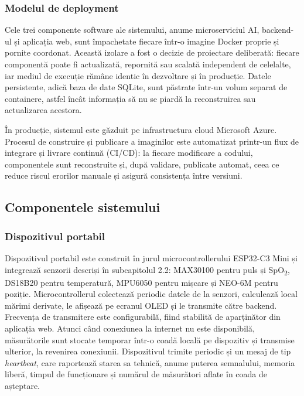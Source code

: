 \documentclass[12pt,a4paper]{article}
\newcommand{\spo}{SpO\textsubscript{2}}
\begin{document}
\subsubsection{Modelul de deployment}

Cele trei componente software ale sistemului, anume microserviciul AI, backend-ul și aplicația web, sunt împachetate fiecare într-o imagine Docker proprie și pornite coordonat. Această izolare a fost o decizie de proiectare deliberată: fiecare componentă poate fi actualizată, repornită sau scalată independent de celelalte, iar mediul de execuție rămâne identic în dezvoltare și în producție. Datele persistente, adică baza de date SQLite, sunt păstrate într-un volum separat de containere, astfel încât informația să nu se piardă la reconstruirea sau actualizarea acestora.

În producție, sistemul este găzduit pe infrastructura cloud Microsoft Azure. Procesul de construire și publicare a imaginilor este automatizat printr-un flux de integrare și livrare continuă (CI/CD): la fiecare modificare a codului, componentele sunt reconstruite și, după validare, publicate automat, ceea ce reduce riscul erorilor manuale și asigură consistența între versiuni.

\subsection{Componentele sistemului}

\subsubsection{Dispozitivul portabil}

Dispozitivul portabil este construit în jurul microcontrollerului ESP32-C3 Mini și integrează senzorii descriși în subcapitolul 2.2: MAX30100 pentru puls și \spo, DS18B20 pentru temperatură, MPU6050 pentru mișcare și NEO-6M pentru poziție. Microcontrollerul colectează periodic datele de la senzori, calculează local mărimi derivate, le afișează pe ecranul OLED și le transmite către backend. Frecvența de transmitere este configurabilă, fiind stabilită de aparținător din aplicația web. Atunci când conexiunea la internet nu este disponibilă, măsurătorile sunt stocate temporar într-o coadă locală pe dispozitiv și transmise ulterior, la revenirea conexiunii. Dispozitivul trimite periodic și un mesaj de tip \textit{heartbeat}, care raportează starea sa tehnică, anume puterea semnalului, memoria liberă, timpul de funcționare și numărul de măsurători aflate în coada de așteptare.
\end{document}

